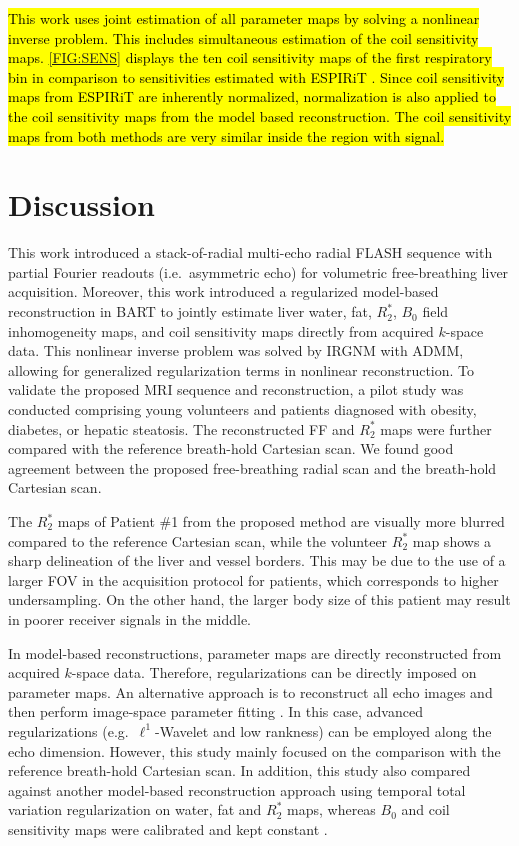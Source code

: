 \documentclass[journal,twoside,web]{ieeecolor}
\begin{document}
\hl{This work uses joint estimation of all parameter maps by solving a
nonlinear inverse problem. This includes simultaneous estimation of the
coil sensitivity maps.
\mbox{\cref{FIG:SENS}} displays the ten coil sensitivity maps 
of the first respiratory bin in comparison to sensitivities estimated
with ESPIRiT \mbox{\cite{uecker_2014_espirit}}.
Since coil sensitivity maps from ESPIRiT are inherently normalized, 
normalization is also applied to the coil sensitivity maps from the
model based reconstruction. The coil sensitivity maps from both
methods are very similar inside the region with signal.}


\section{Discussion}

This work introduced a stack-of-radial multi-echo radial FLASH sequence 
with partial Fourier readouts (i.e.~asymmetric echo) 
for volumetric free-breathing liver acquisition. 
Moreover, this work introduced a regularized model-based reconstruction 
in BART to jointly estimate liver water, fat, $R_2^*$, 
$B_0$ field inhomogeneity maps, and coil sensitivity maps 
directly from acquired $k$-space data. 
This nonlinear inverse problem was solved by IRGNM with ADMM, 
allowing for generalized regularization terms in nonlinear reconstruction. 
To validate the proposed MRI sequence and reconstruction, 
a pilot study was conducted comprising young volunteers and 
patients diagnosed with obesity, diabetes, or hepatic steatosis. 
The reconstructed FF and $R_2^*$ maps were further compared with 
the reference breath-hold Cartesian scan. 
We found good agreement between the proposed free-breathing radial scan 
and the breath-hold Cartesian scan.

The $R_2^*$ maps of Patient \#1 from the proposed method are visually more blurred 
compared to the reference Cartesian scan, 
while the volunteer $R_2^*$ map shows a sharp delineation of the liver and vessel borders. 
This may be due to the use of a larger FOV in the acquisition protocol for patients, 
which corresponds to higher undersampling. 
On the other hand, the larger body size of this patient 
may result in poorer receiver signals in the middle.

In model-based reconstructions, parameter maps are directly reconstructed 
from acquired $k$-space data. 
Therefore, regularizations can be directly imposed on parameter maps. 
An alternative approach is to reconstruct all echo images 
and then perform image-space parameter fitting 
\cite{armstrong_2018_fat,zhong_2020_r2sclinic,zhong_2020_resr2s,wang_2022_mt-me,starekova_2022_fb-fat}.
In this case, advanced regularizations (e.g.~$\ell^1$-Wavelet and low rankness) 
can be employed along the echo dimension. 
However, this study mainly focused on the comparison 
with the reference breath-hold Cartesian scan. 
In addition, this study also compared against another model-based reconstruction approach 
using temporal total variation regularization on water, fat and $R_2^*$ maps, 
whereas $B_0$ and coil sensitivity maps were calibrated and kept constant  \cite{schneider_2020_mobawfr2s}.
\end{document}

